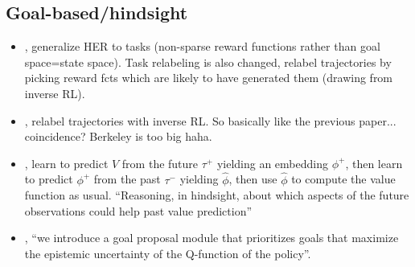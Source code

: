 \subsection{Goal-based/hindsight}

\begin{itemize}
\item \citet{li2020generalized}, generalize HER to tasks (non-sparse reward functions rather than goal space=state space). Task relabeling is also changed, relabel trajectories by picking reward fcts which are likely to have generated them (drawing from inverse RL).
\item \citet{eysenbach2020rewriting}, relabel trajectories with inverse RL. So basically like the previous paper... coincidence? Berkeley is too big haha.
\item \citet{guez2020value}, learn to predict $V$ from the future $\tau^+$ yielding an embedding $\phi^+$, then learn to predict $\phi^+$ from the past $\tau^-$ yielding $\hat\phi$, then use $\hat\phi$ to compute the value function as usual. ``Reasoning, in hindsight, about which aspects of the future observations could help past value prediction''
  \item \citet{zhang2020automatic}, ``we introduce a goal proposal module that prioritizes goals that maximize the epistemic uncertainty of the Q-function of the policy''.
\end{itemize}


